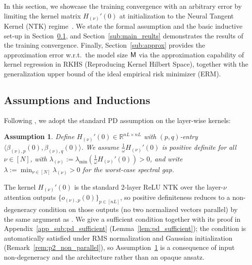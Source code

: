 \documentclass[11pt]{article}
\let\citet\citep
\theoremstyle{plain}
\newtheorem{assumption}[theorem]{Assumption}
\newcommand{\R}{\mathbb{R}}
\begin{document}
In this section, we showcase the training convergence with an arbitrary error by limiting the kernel matrix $H_{(\nu)}'(0)$ at initialization to the Neural Tangent Kernel (NTK) regime~\citep{jgh18, dzps19}. We state the formal assumption and the basic inductive set-up in Section~\ref{sub:inductions}, and Section~\ref{sub:main_reults} demonstrates the results of the training convergence. Finally, Section~\ref{sub:approx} provides the approximation error w.r.t.\ the model size ${\sf M}$ via the approximation capability of kernel regression in RKHS (Reproducing Kernel Hilbert Space), together with the generalization upper bound of the ideal empirical risk minimizer (ERM).

\subsection{Assumptions and Inductions}\label{sub:inductions}

Following \citet{dzps19}, we adopt the standard PD assumption on the layer-wise kernels:
\begin{assumption}\label{ass:positive_definite}
    Define $H_{(\nu)}'(0) \in \R^{nL \times nL}$ with $(p,q)$-entry $\langle \beta_{(\nu),p}(0),\beta_{(\nu),q}(0)\rangle$. We assume $\frac{1}{\omega}H_{(\nu)}'(0)$ is positive definite for all $\nu\in[N]$, with $\lambda_{(\nu)} := \lambda_{\min}(\frac{1}{\omega}H_{(\nu)}'(0)) > 0$, and write $\lambda := \min_{\nu\in[N]}\lambda_{(\nu)} > 0$ for the worst-case spectral gap.
\end{assumption}
\noindent The kernel $H_{(\nu)}'(0)$ is the standard 2-layer ReLU NTK over the layer-$\nu$ attention outputs $\{o_{(\nu),p}(0)\}_{p\in[nL]}$, so positive definiteness reduces to a non-degeneracy condition on those outputs (no two normalized vectors parallel) by the same argument as \citet{dzps19, dllw19, os20}. We give a sufficient condition together with its proof in Appendix~\ref{app_sub:pd_sufficient} (Lemma~\ref{lem:pd_sufficient}); the condition is automatically satisfied under RMS normalization and Gaussian initialization (Remark~\ref{rem:p2_non_parallel}), so Assumption~\ref{ass:positive_definite} is a consequence of input non-degeneracy and the architecture rather than an opaque ansatz.
\end{document}
